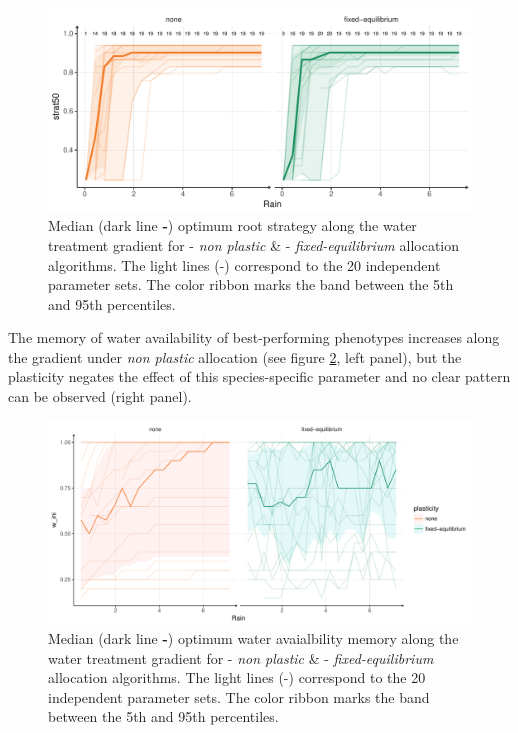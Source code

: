 \begin{figure}\label{fig:gradient_strat_trend}
\includegraphics[width = \textwidth]{./2_PP/Figures/Rain/gradient_strat_trend.pdf}
\caption{Median (dark line \textbf{-}) optimum root strategy along the water treatment gradient for \textcolor{myOrange}{- \textit{non plastic}} \&  \textcolor{myGreen}{- \textit{fixed-equilibrium}} allocation algorithms. The light lines (-) correspond to the 20 independent parameter sets. The color ribbon marks the band between the 5th and 95th percentiles.} %
\end{figure}

The memory of water availability of best-performing phenotypes increases along the gradient under \textit{non plastic} allocation (see figure \ref{fig:gradient_w_ini_trend}, left panel), but the plasticity negates the effect of this species-specific parameter and no clear pattern can be observed (right panel).


\begin{figure}\label{fig:gradient_w_ini_trend}
\includegraphics[width = \textwidth]{./2_PP/Figures/Rain/best_w_ini_pl_rain_grad_alt.pdf}
\caption{Median (dark line \textbf{-}) optimum water avaialbility memory along the water treatment gradient for \textcolor{myOrange}{- \textit{non plastic}} \&  \textcolor{myGreen}{- \textit{fixed-equilibrium}} allocation algorithms. The light lines (-) correspond to the 20 independent parameter sets. The color ribbon marks the band between the 5th and 95th percentiles.} %
\end{figure}


